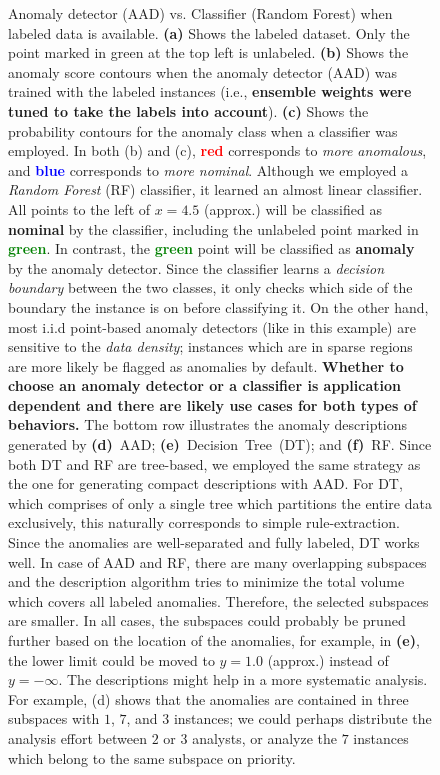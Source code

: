 \documentclass{article} %
\begin{document}
\begin{figure}
	\caption{Anomaly detector (AAD) vs. Classifier (Random Forest) when labeled data is available. {\bf (a)} Shows the labeled dataset. Only the point marked in green at the top left is unlabeled. {\bf (b)} Shows the anomaly score contours when the anomaly detector (AAD) was trained with the labeled instances (i.e., \textbf{ensemble weights were tuned to take the labels into account}). {\bf (c)} Shows the probability contours for the anomaly class when a classifier was employed. In both (b) and (c), \textcolor{red}{\textbf{red}} corresponds to \textit{more anomalous}, and \textcolor{blue}{\textbf{blue}} corresponds to \textit{more nominal}. Although we employed a \textit{Random Forest} (RF) classifier, it learned an almost linear classifier. All points to the left of $x=4.5$ (approx.) will be classified as \textbf{nominal} by the classifier, including the unlabeled point marked in \textcolor{green}{\textbf{green}}. In contrast, the \textcolor{green}{\textbf{green}} point will be classified as \textbf{anomaly} by the anomaly detector. Since the classifier learns a \textit{decision boundary} between the two classes, it only checks which side of the boundary the instance is on before classifying it. On the other hand, most i.i.d point-based anomaly detectors (like in this example) are sensitive to the \textit{data density}; instances which are in sparse regions are more likely be flagged as anomalies by default. \textbf{Whether to choose an anomaly detector or a classifier is application dependent and there are likely use cases for both types of behaviors.} The bottom row illustrates the anomaly descriptions generated by {\bf(d)}~AAD; {\bf(e)}~Decision~Tree~(DT); and {\bf(f)}~RF. Since both DT and RF are tree-based, we employed the same strategy as the one for generating compact descriptions with AAD. For DT, which comprises of only a single tree which partitions the entire data exclusively, this naturally corresponds to simple rule-extraction. Since the anomalies are well-separated and fully labeled, DT works well. In case of AAD and RF, there are many overlapping subspaces and the description algorithm tries to minimize the total volume which covers all labeled anomalies. Therefore, the selected subspaces are smaller. In all cases, the subspaces could probably be pruned further based on the location of the anomalies, for example, in {\bf (e)}, the lower limit could be moved to $y=1.0$ (approx.) instead of $y=-\infty$. The descriptions might help in a more systematic analysis. For example, (d) shows that the anomalies are contained in three subspaces with $1$, $7$, and $3$ instances; we could perhaps distribute the analysis effort between $2$ or $3$ analysts, or analyze the $7$ instances which belong to the same subspace on priority.}
	\label{fig:regression}
\end{figure}
\end{document}

